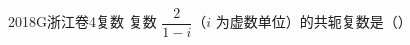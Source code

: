 
\begin{problem}{2018}{G}{浙江卷}{4}{复数}
复数 $ \dfrac{2}{1-i} $（$ i $ 为虚数单位）的共轭复数是（\hspace{1cm}）
\begin{choices}
\end{choices}
\end{problem}

\begin{answer}

\end{answer}

\begin{solutions}

\end{solutions}